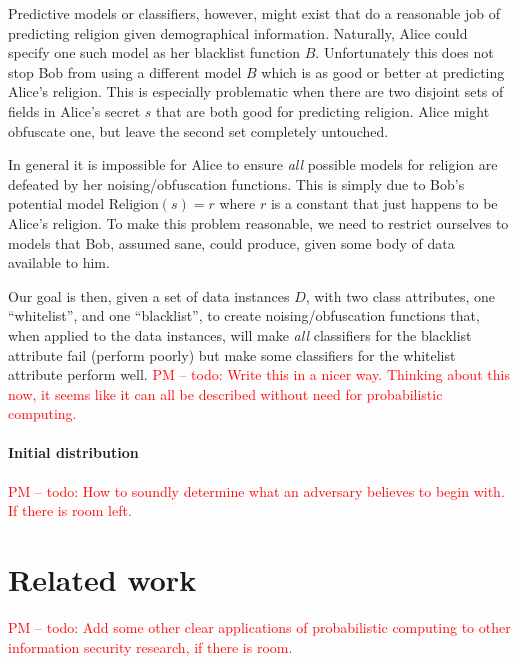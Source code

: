 \documentclass{article} %
\newcommand{\pxm}[1]{\textcolor{red}{PM -- #1}}
\theoremstyle{plain} %
\theoremstyle{definition} %
\begin{document}
Predictive models or classifiers, however, might exist that do a
reasonable job of predicting religion given demographical
information. Naturally, Alice could specify one such model as her
blacklist function $ B $. Unfortunately this does not stop Bob from
using a different model $ B $ which is as good or better at predicting
Alice's religion. This is especially problematic when there are two
disjoint sets of fields in Alice's secret $ s $ that are both good for
predicting religion. Alice might obfuscate one, but leave the second
set completely untouched.

In general it is impossible for Alice to ensure \emph{all} possible
models for religion are defeated by her noising/obfuscation
functions. This is simply due to Bob's potential model $
\text{Religion}(s) = r $ where $ r $ is a constant that just happens
to be Alice's religion. To make this problem reasonable, we need to
restrict ourselves to models that Bob, assumed sane, could produce,
given some body of data available to him.

Our goal is then, given a set of data instances $ D $, with two class
attributes, one ``whitelist'', and one ``blacklist'', to create
noising/obfuscation functions that, when applied to the data
instances, will make \emph{all} classifiers for the blacklist
attribute fail (perform poorly) but make some classifiers for the
whitelist attribute perform well. \pxm{todo: Write this in a nicer
  way. Thinking about this now, it seems like it can all be described
  without need for probabilistic computing.}

\paragraph*{Initial distribution}

\pxm{todo: How to soundly determine what an adversary believes to begin
  with. If there is room left.}

\section*{Related work} \pxm{todo: Add some other clear applications
  of probabilistic computing to other information security research,
  if there is room.}





\end{document}
